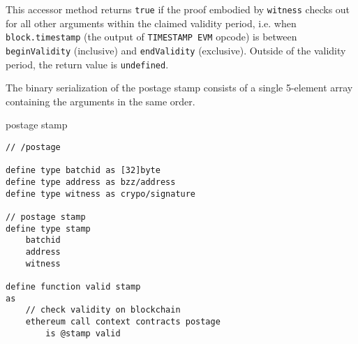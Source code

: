 This accessor method returns \lstinline{true} if the proof embodied by \lstinline{witness} checks out for all other arguments within the claimed 
validity period, i.e. when \lstinline{block.timestamp} (the output of \lstinline{TIMESTAMP EVM} opcode) is between \lstinline{beginValidity} (inclusive) and 
\lstinline{endValidity} (exclusive). Outside of the validity period, the return value is \lstinline{undefined}.

The binary serialization of the postage stamp consists of a single 5-element array containing the arguments in the same order. 


\begin{definition}{postage stamp}\label{def:postage-stamp}
\begin{lstlisting}[language=buzz1]
// /postage

define type batchid as [32]byte  
define type address as bzz/address
define type witness as crypo/signature

// postage stamp
define type stamp  
    batchid
    address
    witness

define function valid stamp
as 
    // check validity on blockchain
    ethereum call context contracts postage
        is @stamp valid
        
\end{lstlisting}
\end{definition}

